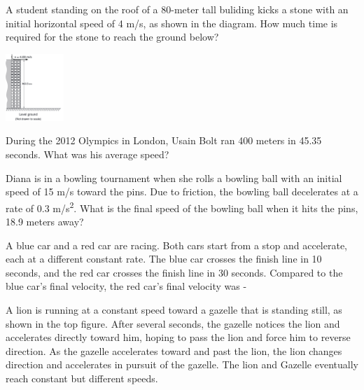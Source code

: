 \documentclass[10pt]{examdesign}
\begin{document}
\begin{multiplechoice} [title={Multiple Choice},
	rearrange=yes]
\begin{question}
\end{question}

\begin{question}
A student standing on the roof of a 80-meter tall buliding kicks a stone with an initial horizontal speed of 4 m/s, as shown in the diagram.  How much time is required for the stone to reach the ground below? 


\includegraphics[height=1in]{building.png}

	\end{question}

\begin{question}
During the 2012 Olympics in London, Usain Bolt ran 400 meters in 45.35 seconds.  What was his average speed? 


	
\end{question}


\begin{question}
Diana is in a bowling tournament when she rolls a bowling ball with an initial speed of 15 m/s toward the pins.  Due to friction, the bowling ball decelerates at a rate of 0.3 m/s\textsuperscript{2}.  What is the final speed of the bowling ball when it hits the pins, 18.9 meters away?


\end{question}


\begin{question}
A blue car and a red car are racing.  Both cars start from a stop and accelerate, each at a different constant rate.  The blue car crosses the finish line in 10 seconds, and the red car crosses the finish line in 30 seconds.  Compared to the blue car's final velocity, the red car's final velocity was - 

	\end{question}

\begin{question}
	
A lion is running at a constant speed toward a gazelle that is standing still, as shown in the top figure.  After several seconds, the gazelle notices the lion and accelerates directly toward him, hoping to pass the lion and force him to reverse direction.  As the gazelle accelerates toward and past the lion, the lion changes direction and accelerates in pursuit of the gazelle.   The lion and Gazelle eventually reach constant but different speeds. 


\end{question}
\end{multiplechoice}
\end{document}
